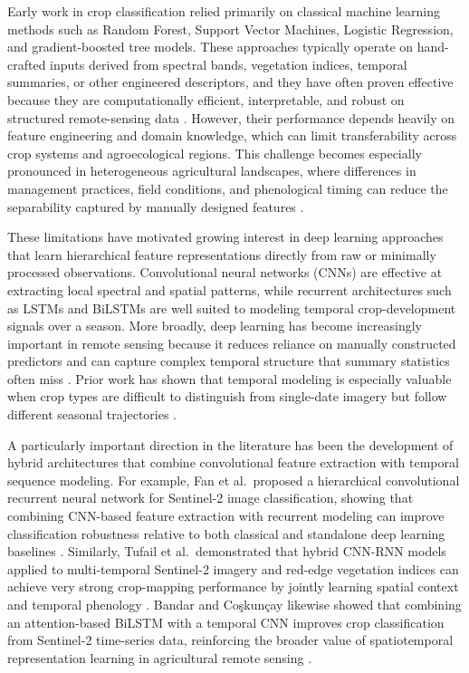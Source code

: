 \documentclass[pdflatex,sn-mathphys]{sn-jnl} %
\begin{document}
Early work in crop classification relied primarily on classical machine learning methods such as Random Forest, Support Vector Machines, Logistic Regression, and gradient-boosted tree models. These approaches typically operate on hand-crafted inputs derived from spectral bands, vegetation indices, temporal summaries, or other engineered descriptors, and they have often proven effective because they are computationally efficient, interpretable, and robust on structured remote-sensing data \cite{maxwell2019, ieee2017}. However, their performance depends heavily on feature engineering and domain knowledge, which can limit transferability across crop systems and agroecological regions. This challenge becomes especially pronounced in heterogeneous agricultural landscapes, where differences in management practices, field conditions, and phenological timing can reduce the separability captured by manually designed features \cite{maxwell2019, ieee2017}.

These limitations have motivated growing interest in deep learning approaches that learn hierarchical feature representations directly from raw or minimally processed observations. Convolutional neural networks (CNNs) are effective at extracting local spectral and spatial patterns, while recurrent architectures such as LSTMs and BiLSTMs are well suited to modeling temporal crop-development signals over a season. More broadly, deep learning has become increasingly important in remote sensing because it reduces reliance on manually constructed predictors and can capture complex temporal structure that summary statistics often miss \cite{zhu2017, teixeira2023}. Prior work has shown that temporal modeling is especially valuable when crop types are difficult to distinguish from single-date imagery but follow different seasonal trajectories \cite{russwurm2018, wardlow2007towards}.

A particularly important direction in the literature has been the development of hybrid architectures that combine convolutional feature extraction with temporal sequence modeling. For example, Fan et al.\ proposed a hierarchical convolutional recurrent neural network for Sentinel-2 image classification, showing that combining CNN-based feature extraction with recurrent modeling can improve classification robustness relative to both classical and standalone deep learning baselines \cite{fan2023hcrnn}. Similarly, Tufail et al.\ demonstrated that hybrid CNN-RNN models applied to multi-temporal Sentinel-2 imagery and red-edge vegetation indices can achieve very strong crop-mapping performance by jointly learning spatial context and temporal phenology \cite{tufail2025cnnrnn}. Bandar and Co\c{s}kun\c{c}ay likewise showed that combining an attention-based BiLSTM with a temporal CNN improves crop classification from Sentinel-2 time-series data, reinforcing the broader value of spatiotemporal representation learning in agricultural remote sensing \cite{bandar2024bilstm}.
\end{document}
